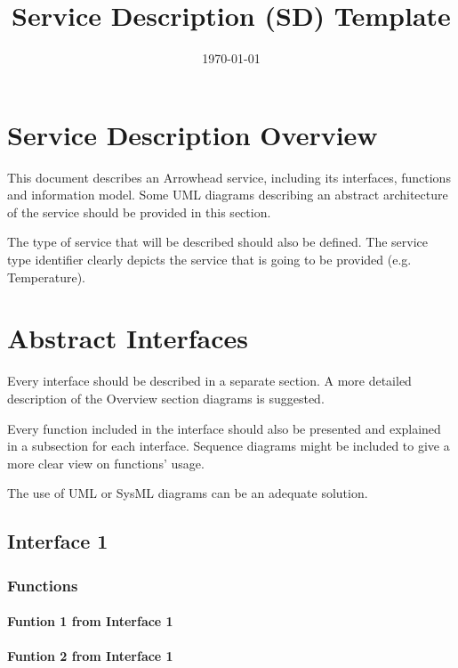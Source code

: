 \documentclass{article}
\date{\today} & 1.2 \\
\title{Service Description (SD) Template}
\begin{document}
\maketitle
\setcounter{tocdepth}{10}
\renewcommand\contentsname{}
\tableofcontents
\newpage

\section[Service Description Overview]{Service Description Overview}
This document describes an Arrowhead service, including its interfaces, functions and information model. Some UML diagrams describing an abstract architecture of the service should be provided in this section. 

The type of service that will be described should also be defined. The service type identifier clearly depicts the service that is going to be provided (e.g. Temperature). 


\section[Abstract Interfaces]{Abstract Interfaces}
Every interface should be described in a separate section. A more detailed description of the Overview section diagrams is suggested. 

Every function included in the interface should also be presented and explained in a subsection for each interface. Sequence diagrams might be included to give a more clear view on functions' usage. 

The use of UML or SysML diagrams can be an adequate solution.

\subsection[Interface 1]{Interface 1}
\subsubsection{Functions}
\paragraph{Funtion 1 from Interface 1}
\paragraph{Funtion 2 from Interface 1}
\end{document}
